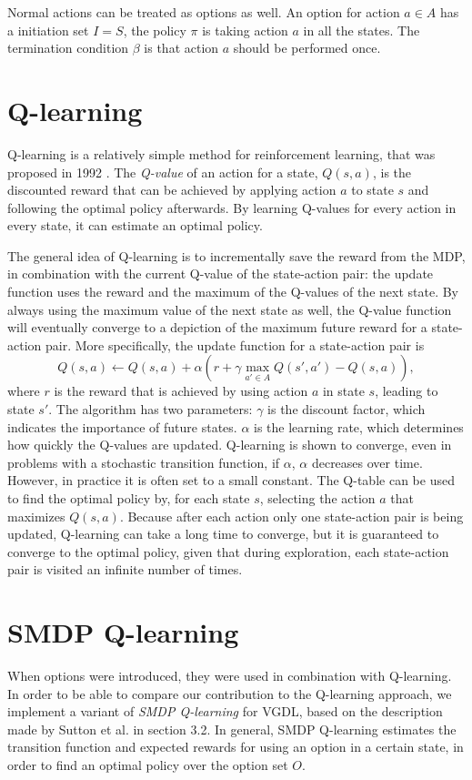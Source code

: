 Normal actions can be treated as options as
well.  An option for action $a \in A$ has a initiation set $I = S$, the policy
$\pi$ is taking action $a$ in all the states.  The termination condition $\beta$
is that action $a$ should be performed once. 

\section{Q-learning}
\label{subsec:qlearning}
Q-learning is a relatively simple method for reinforcement learning,
that was proposed in 1992 \cite{watkins1992q}. The \emph{Q-value} of an action
for a state, $Q(s, a)$, is the discounted reward that can be achieved by
applying action $a$ to state $s$ and following the optimal policy afterwards. By
learning Q-values for every action in every state, it can estimate an optimal
policy. 

The general idea of Q-learning is to incrementally save the reward from the MDP,
in combination with the current Q-value of the state-action pair: the update
function uses the reward and the maximum of the Q-values of the next state. By
always using the maximum value of the next state as well, the Q-value function
will eventually converge to a depiction of the maximum future reward for a
state-action pair. More specifically, the update function for a state-action
pair is
\begin{equation}
	\label{eq:qlearning}
	Q(s, a) \gets Q(s, a) + \alpha \left(r + \gamma \max_{a' \in A} Q(s', a') - Q(s, a)\right),
\end{equation}
where $r$ is the reward that is achieved by using action $a$ in state $s$,
leading to state $s'$. The algorithm has two parameters: $\gamma$ is the
discount factor, which indicates the importance of future states. $\alpha$ is the
learning rate, which determines how quickly the Q-values are updated.
Q-learning is shown to converge, even in problems with a stochastic transition
function, if $\alpha$, $\alpha$ decreases over time. However, in practice it is
often set to a small constant. The Q-table can be used to find the optimal
policy by, for each state $s$, selecting the action $a$ that maximizes $Q(s,
a)$. Because after each action only one state-action pair is being updated,
Q-learning can take a long time to converge, but it is guaranteed to converge to
the optimal policy, given that during exploration, each state-action pair is
visited an infinite number of times.

\section{SMDP Q-learning}
\label{subsec:smdp-qlearning}
When options were introduced, they were used in combination with Q-learning. In
order to be able to compare our contribution to the Q-learning approach, we
implement a variant of \emph{SMDP Q-learning} \cite{sutton1999between} for VGDL,
based on the description made by Sutton et al. in section 3.2. In general, SMDP
Q-learning estimates the transition function and expected rewards for using an
option in a certain state, in order to find an optimal policy over the option
set $O$.

